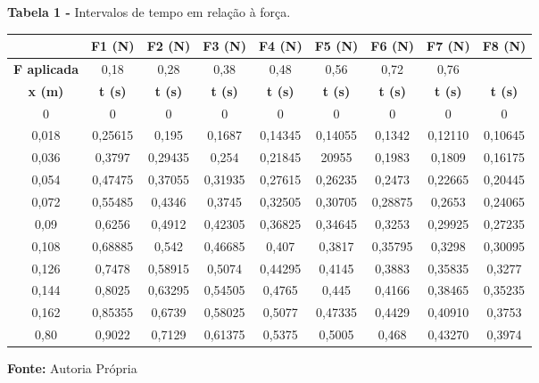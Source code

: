 \documentclass[article,12pt,oneside,a4paper,brazil]{abntex2}
\begin{document}
	\begin{table}[h!]
		\centering
		\begin{adjustwidth}{0cm}{0cm}
			\begin{flushleft}
				\textbf{Tabela 1 -} Intervalos de tempo em relação à força.
			\end{flushleft}
		\end{adjustwidth}
	
		\label{tab:intervalos-forca}
		\begin{tabular}{|c|c|c|c|c|c|c|c|c|}
			\hline
			& \textbf{F1 (N)} & \textbf{F2 (N)} & \textbf{F3 (N)} & \textbf{F4 (N)} & \textbf{F5 (N)} & \textbf{F6 (N)} & \textbf{F7 (N)} & \textbf{F8 (N)} \\ \hline
			\textbf{F aplicada} & 0,18 & 0,28 & 0,38 & 0,48 & 0,56 & 0,72 & 0,76 & \\ \hline
			\textbf{x (m)} & \textbf{t (s)} & \textbf{t (s)} & \textbf{t (s)} & \textbf{t (s)} & \textbf{t (s)} & \textbf{t (s)} & \textbf{t (s)} & \textbf{t (s)} \\ \hline
			0 & 0 & 0 & 0 & 0 & 0 & 0 & 0 & 0 \\ \hline
			0,018 & 0,25615 & 0,195 & 0,1687 & 0,14345 & 0,14055 & 0,1342 & 0,12110 & 0,10645 \\ \hline
			0,036 & 0,3797 & 0,29435 & 0,254 & 0,21845 & 20955 & 0,1983 & 0,1809 & 0,16175 \\ \hline
			0,054 & 0,47475 & 0,37055 & 0,31935 & 0,27615 & 0,26235 & 0,2473 & 0,22665 & 0,20445 \\ \hline
			0,072 & 0,55485 & 0,4346 & 0,3745 & 0,32505 & 0,30705 & 0,28875 & 0,2653 & 0,24065 \\ \hline
			0,09 & 0,6256 & 0,4912 & 0,42305 & 0,36825 & 0,34645 & 0,3253 & 0,29925 & 0,27235 \\ \hline
			0,108 & 0,68885 & 0,542 & 0,46685 & 0,407 & 0,3817 & 0,35795 & 0,3298 & 0,30095 \\ \hline
			0,126 & 0,7478 & 0,58915 & 0,5074 & 0,44295 & 0,4145 & 0,3883 & 0,35835 & 0,3277 \\ \hline
			0,144 & 0,8025 & 0,63295 & 0,54505 & 0,4765 & 0,445 & 0,4166 & 0,38465 & 0,35235 \\ \hline
			0,162 & 0,85355 & 0,6739 & 0,58025 & 0,5077 & 0,47335 & 0,4429 & 0,40910 & 0,3753 \\ \hline
			0,80 & 0,9022 & 0,7129 & 0,61375 & 0,5375 & 0,5005 & 0,468 & 0,43270 & 0,3974 \\ \hline
		\end{tabular}
		
		\begin{adjustwidth}{0cm}{0cm}
			\begin{flushleft}
				\textbf{Fonte: }Autoria Própria
			\end{flushleft}
		\end{adjustwidth}
	\end{table}
\end{document}
